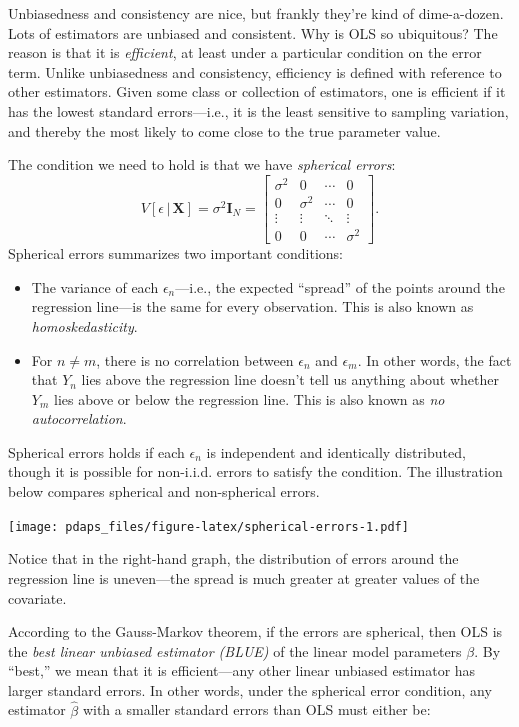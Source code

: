 \documentclass[12pt,oneside,openany]{book}
\begin{document}
Unbiasedness and consistency are nice, but frankly they're kind of
dime-a-dozen. Lots of estimators are unbiased and consistent. Why is OLS
so ubiquitous? The reason is that it is \emph{efficient}, at least under
a particular condition on the error term. Unlike unbiasedness and
consistency, efficiency is defined with reference to other estimators.
Given some class or collection of estimators, one is efficient if it has
the lowest standard errors---i.e., it is the least sensitive to sampling
variation, and thereby the most likely to come close to the true
parameter value.

The condition we need to hold is that we have \emph{spherical errors}:
\[
V[\epsilon \,|\, \mathbf{X}] = \sigma^2 \mathbf{I}_N
= \begin{bmatrix}
  \sigma^2 & 0 & \cdots & 0 \\
  0 & \sigma^2 & \cdots & 0 \\
  \vdots & \vdots & \ddots & \vdots \\
  0 & 0 & \cdots & \sigma^2
\end{bmatrix}.
\] Spherical errors summarizes two important conditions:

\begin{itemize}
\item
  The variance of each \(\epsilon_n\)---i.e., the expected ``spread'' of
  the points around the regression line---is the same for every
  observation. This is also known as \emph{homoskedasticity}.
\item
  For \(n \neq m\), there is no correlation between \(\epsilon_n\) and
  \(\epsilon_m\). In other words, the fact that \(Y_n\) lies above the
  regression line doesn't tell us anything about whether \(Y_m\) lies
  above or below the regression line. This is also known as \emph{no
  autocorrelation}.
\end{itemize}

Spherical errors holds if each \(\epsilon_n\) is independent and
identically distributed, though it is possible for non-i.i.d. errors to
satisfy the condition. The illustration below compares spherical and
non-spherical errors.

\texttt{[image: pdaps\_files/figure-latex/spherical-errors-1.pdf]}

Notice that in the right-hand graph, the distribution of errors around
the regression line is uneven---the spread is much greater at greater
values of the covariate.

According to the Gauss-Markov theorem, if the errors are spherical, then
OLS is the \emph{best linear unbiased estimator (BLUE)} of the linear
model parameters \(\beta\). By ``best,'' we mean that it is
efficient---any other linear unbiased estimator has larger standard
errors. In other words, under the spherical error condition, any
estimator \(\hat{\beta}\) with a smaller standard errors than OLS must
either be:
\end{document}
